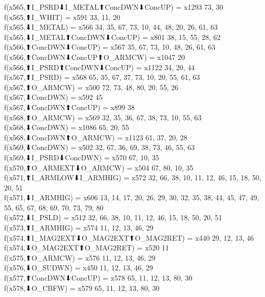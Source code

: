 f(x565,⬆I_PSRD⬇I_METAL⬆ConcDWN⬇ConcUP) = x1293 {73, 30} \\
f(x565,⬆I_WHIT) = x591 {33, 11, 20} \\
f(x565,⬇I_METAL) = x566 {34, 35, 67, 73, 10, 44, 48, 20, 26, 61, 63} \\
f(x565,⬇I_METAL⬆ConcDWN⬇ConcUP) = x801 {38, 15, 55, 28, 62} \\
f(x566,⬆ConcDWN⬇ConcUP) = x567 {35, 67, 73, 10, 48, 26, 61, 63} \\
f(x566,⬆ConcDWN⬇ConcUP⬆O_ARMCW) = x1047 {20} \\
f(x566,⬆I_PSRD⬆ConcDWN⬇ConcUP) = x1122 {34, 20, 44} \\
f(x567,⬆I_PSRD) = x568 {65, 35, 67, 37, 73, 10, 20, 55, 61, 63} \\
f(x567,⬆O_ARMCW) = x500 {72, 73, 48, 80, 20, 55, 26} \\
f(x567,⬇ConcDWN) = x592 {45} \\
f(x567,⬇ConcDWN⬆ConcUP) = x899 {38} \\
f(x568,⬆O_ARMCW) = x569 {32, 35, 36, 67, 38, 73, 10, 55, 63} \\
f(x568,⬇ConcDWN) = x1086 {65, 20, 55} \\
f(x568,⬇ConcDWN⬆O_ARMCW) = x1123 {61, 37, 20, 28} \\
f(x569,⬇ConcDWN) = x502 {32, 67, 36, 69, 38, 73, 46, 55, 63} \\
f(x569,⬇I_PSRD⬇ConcDWN) = x570 {67, 10, 35} \\
f(x570,⬆O_ARMEXT⬇O_ARMCW) = x504 {67, 80, 10, 35} \\
f(x571,⬆I_ARMLOW⬇I_ARMHIG) = x572 {32, 66, 38, 10, 11, 12, 46, 15, 18, 50, 20, 51} \\
f(x571,⬇I_ARMHIG) = x606 {13, 14, 17, 20, 26, 29, 30, 32, 35, 38, 44, 45, 47, 49, 55, 65, 67, 68, 69, 70, 73, 79, 80} \\
f(x572,⬇I_PSLD) = x512 {32, 66, 38, 10, 11, 12, 46, 15, 18, 50, 20, 51} \\
f(x573,⬆I_ARMHIG) = x574 {11, 12, 13, 46, 29} \\
f(x574,⬆I_MAG2EXT⬇O_MAG2EXT⬆O_MAG2RET) = x440 {29, 12, 13, 46} \\
f(x574,⬇O_MAG2EXT⬆O_MAG2RET) = x520 {11} \\
f(x575,⬆O_ARMCW) = x576 {11, 12, 13, 46, 29} \\
f(x576,⬇O_SUDWN) = x450 {11, 12, 13, 46, 29} \\
f(x577,⬆ConcDWN⬇ConcUP) = x578 {65, 11, 12, 13, 80, 30} \\
f(x578,⬇O_CBFW) = x579 {65, 11, 12, 13, 80, 30} \\
